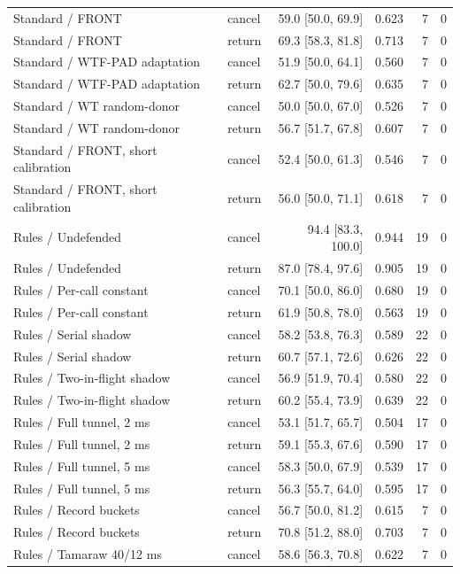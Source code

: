 \begin{longtable}{@{}llrrrr@{}}
Standard / FRONT & cancel & 59.0 [50.0, 69.9] & 0.623 & 7 & 0\\
Standard / FRONT & return & 69.3 [58.3, 81.8] & 0.713 & 7 & 0\\
Standard / WTF-PAD adaptation & cancel & 51.9 [50.0, 64.1] & 0.560 & 7 & 0\\
Standard / WTF-PAD adaptation & return & 62.7 [50.0, 79.6] & 0.635 & 7 & 0\\
Standard / WT random-donor & cancel & 50.0 [50.0, 67.0] & 0.526 & 7 & 0\\
Standard / WT random-donor & return & 56.7 [51.7, 67.8] & 0.607 & 7 & 0\\
Standard / FRONT, short calibration & cancel & 52.4 [50.0, 61.3] & 0.546 & 7 & 0\\
Standard / FRONT, short calibration & return & 56.0 [50.0, 71.1] & 0.618 & 7 & 0\\
Rules / Undefended & cancel & 94.4 [83.3, 100.0] & 0.944 & 19 & 0\\
Rules / Undefended & return & 87.0 [78.4, 97.6] & 0.905 & 19 & 0\\
Rules / Per-call constant & cancel & 70.1 [50.0, 86.0] & 0.680 & 19 & 0\\
Rules / Per-call constant & return & 61.9 [50.8, 78.0] & 0.563 & 19 & 0\\
Rules / Serial shadow & cancel & 58.2 [53.8, 76.3] & 0.589 & 22 & 0\\
Rules / Serial shadow & return & 60.7 [57.1, 72.6] & 0.626 & 22 & 0\\
Rules / Two-in-flight shadow & cancel & 56.9 [51.9, 70.4] & 0.580 & 22 & 0\\
Rules / Two-in-flight shadow & return & 60.2 [55.4, 73.9] & 0.639 & 22 & 0\\
Rules / Full tunnel, 2 ms & cancel & 53.1 [51.7, 65.7] & 0.504 & 17 & 0\\
Rules / Full tunnel, 2 ms & return & 59.1 [55.3, 67.6] & 0.590 & 17 & 0\\
Rules / Full tunnel, 5 ms & cancel & 58.3 [50.0, 67.9] & 0.539 & 17 & 0\\
Rules / Full tunnel, 5 ms & return & 56.3 [55.7, 64.0] & 0.595 & 17 & 0\\
Rules / Record buckets & cancel & 56.7 [50.0, 81.2] & 0.615 & 7 & 0\\
Rules / Record buckets & return & 70.8 [51.2, 88.0] & 0.703 & 7 & 0\\
Rules / Tamaraw 40/12 ms & cancel & 58.6 [56.3, 70.8] & 0.622 & 7 & 0\\

\end{longtable}
